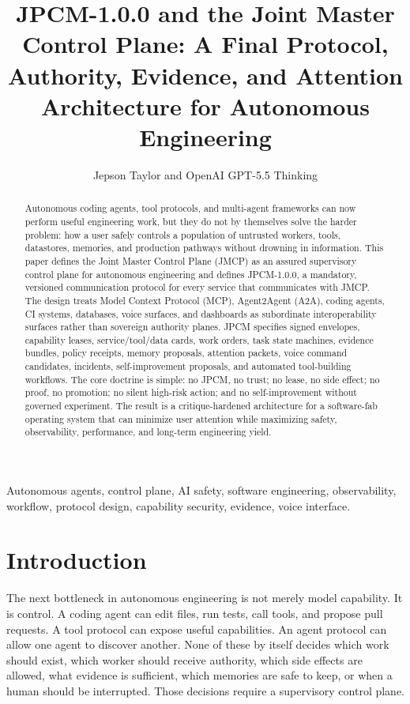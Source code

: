 \documentclass[10pt,journal,onecolumn]{IEEEtran}
\begin{document}
\title{JPCM-1.0.0 and the Joint Master Control Plane: A Final Protocol, Authority, Evidence, and Attention Architecture for Autonomous Engineering}
\author{Jepson Taylor and OpenAI GPT-5.5 Thinking}
\maketitle
\begin{abstract}
Autonomous coding agents, tool protocols, and multi-agent frameworks can now perform useful engineering work, but they do not by themselves solve the harder problem: how a user safely controls a population of untrusted workers, tools, datastores, memories, and production pathways without drowning in information. This paper defines the Joint Master Control Plane (JMCP) as an assured supervisory control plane for autonomous engineering and defines JPCM-1.0.0, a mandatory, versioned communication protocol for every service that communicates with JMCP. The design treats Model Context Protocol (MCP), Agent2Agent (A2A), coding agents, CI systems, databases, voice surfaces, and dashboards as subordinate interoperability surfaces rather than sovereign authority planes. JPCM specifies signed envelopes, capability leases, service/tool/data cards, work orders, task state machines, evidence bundles, policy receipts, memory proposals, attention packets, voice command candidates, incidents, self-improvement proposals, and automated tool-building workflows. The core doctrine is simple: no JPCM, no trust; no lease, no side effect; no proof, no promotion; no silent high-risk action; and no self-improvement without governed experiment. The result is a critique-hardened architecture for a software-fab operating system that can minimize user attention while maximizing safety, observability, performance, and long-term engineering yield.
\end{abstract}
\begin{IEEEkeywords}
Autonomous agents, control plane, AI safety, software engineering, observability, workflow, protocol design, capability security, evidence, voice interface.
\end{IEEEkeywords}

\section{Introduction}
The next bottleneck in autonomous engineering is not merely model capability. It is control. A coding agent can edit files, run tests, call tools, and propose pull requests. A tool protocol can expose useful capabilities. An agent protocol can allow one agent to discover another. None of these by itself decides which work should exist, which worker should receive authority, which side effects are allowed, what evidence is sufficient, which memories are safe to keep, or when a human should be interrupted. Those decisions require a supervisory control plane.
\end{document}
